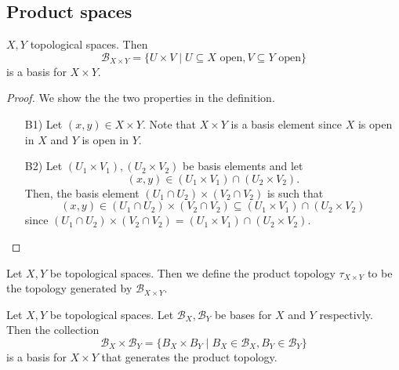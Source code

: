 \subsection{Product spaces}

\begin{proposition}
   \( X, Y  \) topological spaces. Then 
   \[
     \mathscr{B}_{X \times Y} = \{ U \times V \mid U \subseteq X \text{ open}, V \subseteq Y \text{ open} \} 
   \]
   is a basis for \( X \times Y \).
\end{proposition}

\begin{proof}
   We show the the two properties in the definition.
   \begin{enumerate}
     \item[B1)] Let \( (x, y) \in X \times Y \). Note that
       \( X \times Y \) is a basis element since
       \( X \) is open in \( X \) and \( Y \) is 
       open in \( Y \).
     \item[B2)] Let \( (U_1 \times V_1), (U_2 \times V_2) \)
       be basis elements and let 
       \[ 
        (x, y) \in (U_1 \times V_1) \cap (U_2 \times V_2).
       \]
       Then, the basis element \( (U_1 \cap U_2 ) \times (V_2 \cap V_2) \) is such that 
       \[
        (x, y)
          \in (U_1 \cap U_2 ) \times (V_2 \cap V_2)
          \subseteq (U_1 \times V_1) \cap (U_2 \times V_2)
       \]
       since \( (U_1 \cap U_2 ) \times (V_2 \cap V_2) =
          (U_1 \times V_1) \cap (U_2 \times V_2) \).
   \end{enumerate}
\end{proof}

\begin{definition}
  Let \( X, Y \) be topological spaces. Then we define the
  product topology \( \tau_{X \times Y} \) to be
  the topology generated by \( \mathscr{B}_{X \times Y} \).
\end{definition}

\begin{proposition}
   Let \( X, Y \) be topological spaces.
Let \( \mathscr{B}_X, \mathscr{B}_Y \) be bases for \( X \) and \( Y \) respectivly.
Then the collection 
\[
  \mathscr{B}_X \times \mathscr{B}_Y = \{ B_X \times B_Y \mid B_X \in \mathscr{B}_X, B_Y \in \mathscr{B}_Y \} 
\]
is a basis for \( X \times Y \) that generates the product topology.
\end{proposition}

